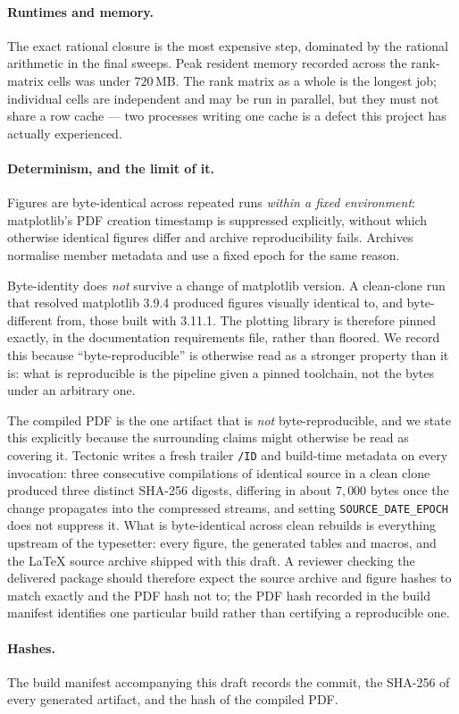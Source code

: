 \paragraph{Runtimes and memory.}
The exact rational closure is the most expensive step, dominated by the rational
arithmetic in the final sweeps. Peak resident memory recorded across the
rank-matrix cells was under $720$\,MB. The rank matrix as a whole is the longest
job; individual cells are independent and may be run in parallel, but they must
not share a row cache --- two processes writing one cache is a defect this
project has actually experienced.

\paragraph{Determinism, and the limit of it.}
Figures are byte-identical across repeated runs \emph{within a fixed
environment}: matplotlib's PDF creation timestamp is suppressed explicitly,
without which otherwise identical figures differ and archive reproducibility
fails. Archives normalise member metadata and use a fixed epoch for the same
reason.

Byte-identity does \emph{not} survive a change of matplotlib version. A
clean-clone run that resolved matplotlib 3.9.4 produced figures visually
identical to, and byte-different from, those built with 3.11.1. The plotting
library is therefore pinned exactly, in the documentation requirements file,
rather than floored. We record this
because ``byte-reproducible'' is otherwise read as a stronger property than it
is: what is reproducible is the pipeline given a pinned toolchain, not the bytes
under an arbitrary one.

The compiled PDF is the one artifact that is \emph{not} byte-reproducible, and
we state this explicitly because the surrounding claims might otherwise be read
as covering it. Tectonic writes a fresh trailer \texttt{/ID} and build-time
metadata on every invocation: three consecutive compilations of identical source
in a clean clone produced three distinct SHA-256 digests, differing in about
$7{,}000$ bytes once the change propagates into the compressed streams, and
setting \texttt{SOURCE\_DATE\_EPOCH} does not suppress it. What is byte-identical
across clean rebuilds is everything upstream of the typesetter: every figure,
the generated tables and macros, and the LaTeX source archive shipped with this
draft. A reviewer checking the delivered package should therefore expect the
source archive and figure hashes to match exactly and the PDF hash not to; the
PDF hash recorded in the build manifest identifies one particular build rather
than certifying a reproducible one.

\paragraph{Hashes.}
The build manifest accompanying this draft records the commit, the SHA-256 of
every generated artifact, and the hash of the compiled PDF.
